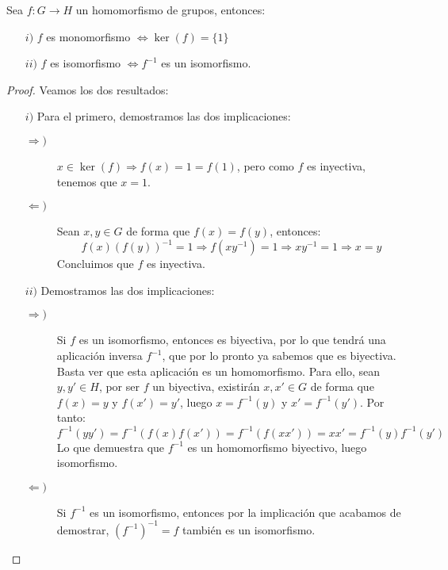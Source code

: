 \begin{prop}\label{prop:propiedades_homorf}
    Sea $f:G\to H$ un homomorfismo de grupos, entonces:
    \begin{enumerate}
        \item[$i)$] $f$ es monomorfismo $\Longleftrightarrow \ker(f)=\{1\}$
        \item[$ii)$] $f$ es isomorfismo $\Longleftrightarrow f^{-1}$ es un isomorfismo.
    \end{enumerate}
    \begin{proof}
            Veamos los dos resultados:
        \begin{enumerate}
            \item[$i)$] Para el primero, demostramos las dos implicaciones:
                \begin{description}
                    \item [$\Longrightarrow)$] $x\in \ker(f) \Longrightarrow f(x) = 1 = f(1)$, pero como $f$ es inyectiva, tenemos que $x=1$.
                    \item [$\Longleftarrow)$] Sean $x,y\in G$ de forma que $f(x)=f(y)$, entonces:
                        \begin{equation*}
                            f(x){(f(y))}^{-1} = 1 \Longrightarrow f(xy^{-1}) = 1 \Longrightarrow xy^{-1} = 1 \Longrightarrow x = y
                        \end{equation*}
                        Concluimos que $f$ es inyectiva.
                \end{description}
            \item[$ii)$] Demostramos las dos implicaciones:
                \begin{description}
                    \item [$\Longrightarrow)$] Si $f$ es un isomorfismo, entonces es biyectiva, por lo que tendrá una aplicación inversa $f^{-1}$, que por lo pronto ya sabemos que es biyectiva. Basta ver que esta aplicación es un homomorfismo. Para ello, sean ${y,y'\in H}$, por ser $f$ un biyectiva, existirán $x,x'\in G$ de forma que $f(x) = y$ y $f(x')=y'$, luego $x = f^{-1}(y)$ y $x' = f^{-1}(y')$. Por tanto:
                        \begin{equation*}
                            f^{-1}(yy') = f^{-1}(f(x)f(x')) = f^{-1}(f(xx')) = xx' = f^{-1}(y)f^{-1}(y')
                        \end{equation*}
                        Lo que demuestra que $f^{-1}$ es un homomorfismo biyectivo, luego isomorfismo.
                    \item [$\Longleftarrow)$] Si $f^{-1}$ es un isomorfismo, entonces por la implicación que acabamos de demostrar, ${(f^{-1})}^{-1} = f$ también es un isomorfismo.
                    \qedhere
                \end{description}
        \end{enumerate}
    \end{proof}
\end{prop}

